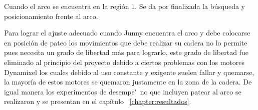 Cuando el arco se encuentra en la regi\'on 1. Se da por finalizada la búsqueda y posicionamiento frente al arco.  

Para lograr el ajuste adecuado cuando Junny encuentra el arco y debe colocarse en posici\'on de pateo los movimientos que debe realizar su cadera no lo permite pues necesita un grado de libertad m\'as para lograrlo, este grado de libertad fue eliminado al principio del proyecto debido a ciertos problemas con los motores Dynamixel los cuales debido al uso constante y exigente suelen fallar y quemarse, la mayor\'ia de estos motores se quemaron justamente en la zona de la cadera. De igual manera los experimentos de desempe\'~no que incluyen patear al arco se realizaron y se presentan en el cap\'itulo ~\ref{chapter:resultados}.






